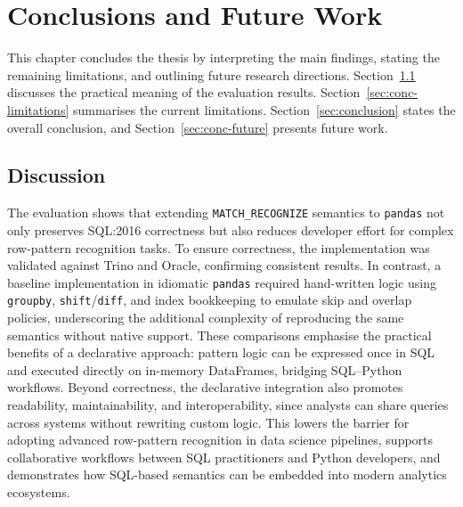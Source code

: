 \chapter{Conclusions and Future Work}
\label{chap:conclusions}

This chapter concludes the thesis by interpreting the main findings,
stating the remaining limitations, and outlining future research
directions.  Section~\ref{sec:discussion} discusses the practical
meaning of the evaluation results.  Section~\ref{sec:conc-limitations}
summarises the current limitations.  Section~\ref{sec:conclusion}
states the overall conclusion, and Section~\ref{sec:conc-future}
presents future work.

\section{Discussion}
\label{sec:discussion}

The evaluation shows that extending \texttt{MATCH\_RECOGNIZE} semantics
to \texttt{pandas} not only preserves SQL:2016 correctness but also
reduces developer effort for complex row-pattern recognition tasks.
To ensure correctness, the implementation was validated against Trino
and Oracle, confirming consistent results.  In contrast, a baseline
implementation in idiomatic \texttt{pandas} required hand-written
logic using \texttt{groupby}, \texttt{shift}/\texttt{diff}, and index
bookkeeping to emulate skip and overlap policies, underscoring the
additional complexity of reproducing the same semantics without native
support.  These comparisons emphasise the practical benefits of a
declarative approach: pattern logic can be expressed once in SQL and
executed directly on in-memory DataFrames, bridging SQL--Python
workflows.  Beyond correctness, the declarative integration also
promotes readability, maintainability, and interoperability, since
analysts can share queries across systems without rewriting custom
logic.  This lowers the barrier for adopting advanced row-pattern
recognition in data science pipelines, supports collaborative
workflows between SQL practitioners and Python developers, and
demonstrates how SQL-based semantics can be embedded into modern
analytics ecosystems.

